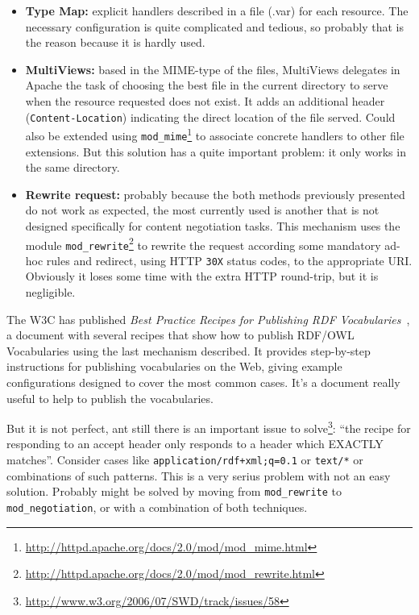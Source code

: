 \begin{itemize}

  \item \textbf{Type Map:} explicit handlers described in a file (.var) for each 
        resource. The necessary configuration is quite complicated and tedious, 
        so probably that is the reason because it is hardly used.

  \item \textbf{MultiViews:} based in the MIME-type of the files, MultiViews 
        delegates in Apache the task of choosing the best file in the current 
        directory to serve when the resource requested does not exist. It adds 
        an additional header (\texttt{Content-Location}) indicating the direct 
        location of the file served. Could also be extended using 
        \texttt{mod\_mime}\footnote{\url{http://httpd.apache.org/docs/2.0/mod/mod_mime.html}}
        to associate concrete handlers to other file extensions. But this solution
        has a quite important problem: it only works in the same directory.

  \item \textbf{Rewrite request:} probably because the both methods previously 
        presented do not work as expected, the most currently used is another 
        that is not designed specifically for content negotiation tasks. This
        mechanism uses the module 
        \texttt{mod\_rewrite}\footnote{\url{http://httpd.apache.org/docs/2.0/mod/mod_rewrite.html}}
        to rewrite the request according some mandatory ad-hoc rules and redirect,
        using HTTP \texttt{30X} status codes, to the appropriate URI. Obviously it loses 
        some time with the extra HTTP round-trip, but it is negligible.

\end{itemize}


The W3C has published \textit{Best Practice Recipes for Publishing RDF Vocabularies}~\cite{Recipes},
a document with several recipes that show how to publish RDF/OWL Vocabularies using
the last mechanism described. It provides step-by-step instructions for publishing 
vocabularies on the Web, giving example configurations designed to cover the most 
common cases. It's a document really useful to help to publish the vocabularies.

But it is not perfect, ant still there is an important issue to 
solve\footnote{\url{http://www.w3.org/2006/07/SWD/track/issues/58}}: 
``the recipe for responding to an accept header only responds to a header which
EXACTLY matches''. Consider cases like \texttt{application/rdf+xml;q=0.1} or 
\texttt{text/*} or combinations of such patterns. This is a very serius problem
with not an easy solution. Probably might be solved by moving from \texttt{mod\_rewrite}
to \texttt{mod\_negotiation}, or with a combination of both techniques.

